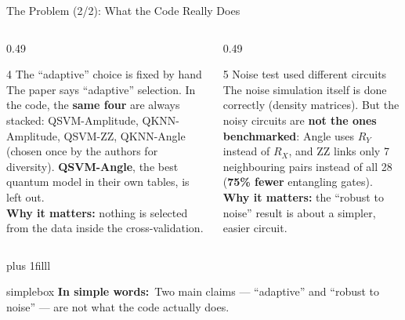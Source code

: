 \documentclass[aspectratio=169,11pt,t,xcolor={table}]{beamer}
\newcommand{\insimple}[1]{%
  \par\vskip 0pt plus 1filll
  \begin{beamercolorbox}[wd=\textwidth,sep=4pt,rounded=true]{simplebox}%
    \small\textbf{\textcolor{qamber!75!black}{In simple words:}}\ #1%
  \end{beamercolorbox}\vskip1pt}
\begin{document}
\begin{frame}{The Problem (2/2): What the Code Really Does}
  \begin{columns}[T,onlytextwidth]
    \begin{column}{0.49\textwidth}
      \begin{block}{4 \textbullet{} The ``adaptive'' choice is fixed by hand}
        \small
        The paper says ``adaptive'' selection. In the code, the \textbf{same four} are always stacked: QSVM-Amplitude, QKNN-Amplitude, QSVM-ZZ, QKNN-Angle (chosen once by the authors for diversity).
        \textbf{QSVM-Angle}, the best quantum model in their own tables, is left out.\\[4pt]
        \textbf{Why it matters:} nothing is selected from the data inside the cross-validation.
      \end{block}
    \end{column}
    \begin{column}{0.49\textwidth}
      \begin{block}{5 \textbullet{} Noise test used different circuits}
        \small
        The noise simulation itself is done correctly (density matrices). But the noisy circuits are \textbf{not the ones benchmarked}: Angle uses $R_Y$ instead of $R_X$, and ZZ links only 7 neighbouring pairs instead of all 28 (\textbf{75\% fewer} entangling gates).\\[4pt]
        \textbf{Why it matters:} the ``robust to noise'' result is about a simpler, easier circuit.
      \end{block}
    \end{column}
  \end{columns}
  \insimple{Two main claims --- ``adaptive'' and ``robust to noise'' --- are not what the code actually does.}
\end{frame}
\end{document}
